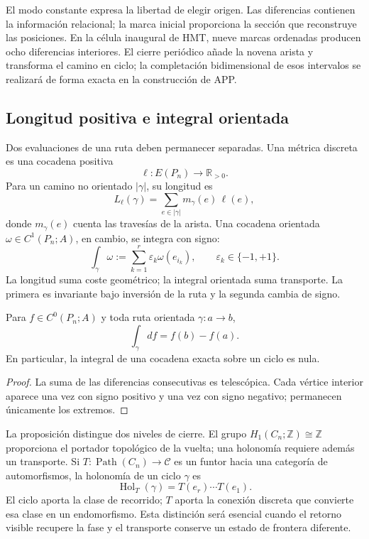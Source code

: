 El modo constante expresa la libertad de elegir origen. Las diferencias
contienen la información relacional; la marca inicial proporciona la sección
que reconstruye las posiciones. En la célula inaugural de HMT, nueve marcas
ordenadas producen ocho diferencias interiores. El cierre periódico añade la
novena arista y transforma el camino en ciclo; la completación bidimensional
de esos intervalos se realizará de forma exacta en la construcción de APP.

\subsection{Longitud positiva e integral orientada}

Dos evaluaciones de una ruta deben permanecer separadas. Una métrica discreta
es una cocadena positiva
\[
 \ell:E(P_n)\longrightarrow\mathbb R_{>0}.
\]
Para un camino no orientado \(|\gamma|\), su longitud es
\begin{equation}
 L_\ell(\gamma)=\sum_{e\in|\gamma|}m_\gamma(e)\,\ell(e),
 \label{eq:longitud-positiva-camino-rev2}
\end{equation}
donde \(m_\gamma(e)\) cuenta las travesías de la arista. Una cocadena
orientada \(\omega\in C^1(P_n;A)\), en cambio, se integra con signo:
\begin{equation}
 \int_\gamma\omega
 :=\sum_{k=1}^{r}\varepsilon_k\omega(e_{i_k}),
 \qquad \varepsilon_k\in\{-1,+1\}.
 \label{eq:integral-cocadena-camino-rev2}
\end{equation}
La longitud suma coste geométrico; la integral orientada suma transporte. La
primera es invariante bajo inversión de la ruta y la segunda cambia de signo.

\begin{proposition}
\label{prop:teorema-fundamental-discreto-rev2}
Para \(f\in C^0(P_n;A)\) y toda ruta orientada \(\gamma:a\to b\),
\[
 \int_\gamma df=f(b)-f(a).
\]
En particular, la integral de una cocadena exacta sobre un ciclo es nula.
\end{proposition}

\begin{proof}
La suma de las diferencias consecutivas es telescópica. Cada vértice interior
aparece una vez con signo positivo y una vez con signo negativo; permanecen
únicamente los extremos.
\end{proof}

La proposición distingue dos niveles de cierre. El grupo
\(H_1(C_n;\mathbb Z)\cong\mathbb Z\) proporciona el portador topológico de la
vuelta; una holonomía requiere además un transporte. Si
\(T:\operatorname{Path}(C_n)\to\mathcal C\) es un funtor hacia una categoría
de automorfismos, la holonomía de un ciclo \(\gamma\) es
\begin{equation}
 \operatorname{Hol}_T(\gamma)=T(e_r)\cdots T(e_1).
 \label{eq:holonomia-transporte-ciclo-rev2}
\end{equation}
El ciclo aporta la clase de recorrido; \(T\) aporta la conexión discreta que
convierte esa clase en un endomorfismo. Esta distinción será esencial cuando
el retorno visible recupere la fase y el transporte conserve un estado de
frontera diferente.

